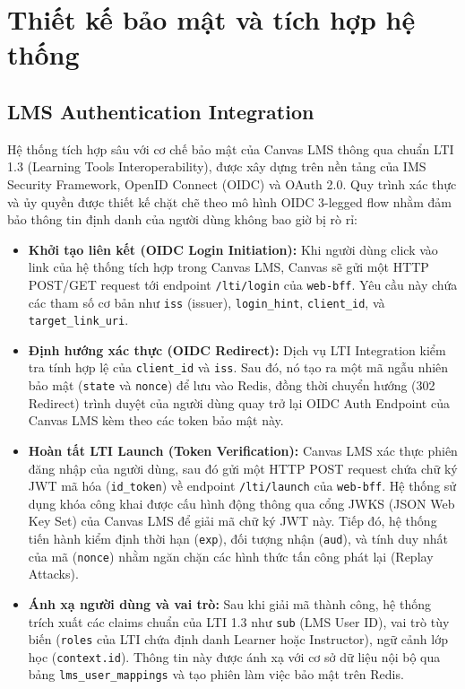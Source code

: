 \section{Thiết kế bảo mật và tích hợp hệ thống}

\subsection{LMS Authentication Integration}

Hệ thống tích hợp sâu với cơ chế bảo mật của Canvas LMS thông qua chuẩn
LTI 1.3 (Learning Tools Interoperability), được xây dựng trên nền tảng
của IMS Security Framework, OpenID Connect (OIDC) và OAuth 2.0. Quy trình
xác thực và ủy quyền được thiết kế chặt chẽ theo mô hình OIDC 3-legged
flow nhằm đảm bảo thông tin định danh của người dùng không bao giờ bị rò
rỉ:

\begin{itemize}
    \item \textbf{Khởi tạo liên kết (OIDC Login Initiation):} Khi người
          dùng click vào link của hệ thống tích hợp trong Canvas LMS,
          Canvas sẽ gửi một HTTP POST/GET request tới endpoint
          \texttt{/lti/login} của \texttt{web-bff}. Yêu cầu này chứa các
          tham số cơ bản như \texttt{iss} (issuer), \texttt{login\_hint},
          \texttt{client\_id}, và \texttt{target\_link\_uri}.
    \item \textbf{Định hướng xác thực (OIDC Redirect):} Dịch vụ LTI
          Integration kiểm tra tính hợp lệ của \texttt{client\_id} và
          \texttt{iss}. Sau đó, nó tạo ra một mã ngẫu nhiên bảo mật
          (\texttt{state} và \texttt{nonce}) để lưu vào Redis, đồng thời
          chuyển hướng (302 Redirect) trình duyệt của người dùng quay trở
          lại OIDC Auth Endpoint của Canvas LMS kèm theo các token bảo mật
          này.
    \item \textbf{Hoàn tất LTI Launch (Token Verification):} Canvas LMS
          xác thực phiên đăng nhập của người dùng, sau đó gửi một HTTP POST
          request chứa chữ ký JWT mã hóa (\texttt{id\_token}) về endpoint
          \texttt{/lti/launch} của \texttt{web-bff}. Hệ thống sử dụng khóa
          công khai được cấu hình động thông qua cổng JWKS (JSON Web Key
          Set) của Canvas LMS để giải mã chữ ký JWT này. Tiếp đó, hệ thống
          tiến hành kiểm định thời hạn (\texttt{exp}), đối tượng nhận
          (\texttt{aud}), và tính duy nhất của mã (\texttt{nonce}) nhằm
          ngăn chặn các hình thức tấn công phát lại (Replay Attacks).
    \item \textbf{Ánh xạ người dùng và vai trò:} Sau khi giải mã thành
          công, hệ thống trích xuất các claims chuẩn của LTI 1.3 như
          \texttt{sub} (LMS User ID), vai trò tùy biến (\texttt{roles}
          của LTI chứa định danh Learner hoặc Instructor), ngữ cảnh lớp
          học (\texttt{context.id}). Thông tin này được ánh xạ với cơ sở
          dữ liệu nội bộ qua bảng \texttt{lms\_user\_mappings} và tạo
          phiên làm việc bảo mật trên Redis.
\end{itemize}

